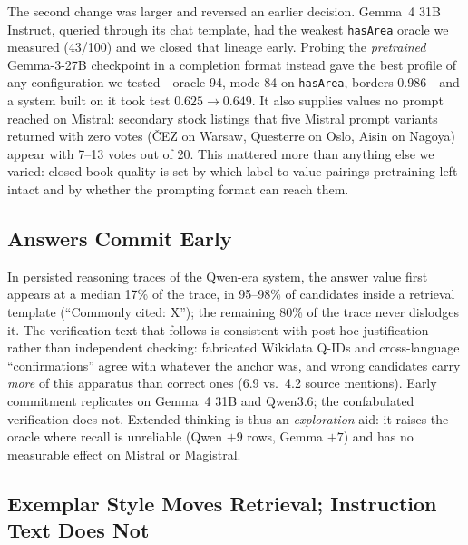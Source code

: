 \documentclass[11pt]{article}
\begin{document}
The second change was larger and reversed an earlier decision. Gemma~4
31B Instruct, queried through its chat template, had the weakest
\texttt{hasArea} oracle we measured (43/100) and we closed that lineage
early. Probing the \emph{pretrained} Gemma-3-27B checkpoint in a
completion format instead gave the best profile of any configuration we
tested---oracle 94, mode 84 on \texttt{hasArea}, borders 0.986---and a
system built on it took test $0.625\rightarrow0.649$. It also supplies
values no prompt reached on Mistral: secondary stock listings that five
Mistral prompt variants returned with zero votes (\v{C}EZ on Warsaw,
Questerre on Oslo, Aisin on Nagoya) appear with 7--13 votes out of 20.
This mattered more than anything else we varied: closed-book
quality is set by which label-to-value pairings pretraining left intact
and by whether the prompting format can reach them.

\subsection{Answers Commit Early}
\label{sec:anchor}

In persisted reasoning traces of the Qwen-era system, the answer value
first appears at a median 17\% of the trace, in 95--98\% of candidates
inside a retrieval template (``Commonly cited: X''); the remaining 80\%
of the trace never dislodges it. The verification text that follows is
consistent with post-hoc justification rather than independent checking:
fabricated Wikidata Q-IDs and cross-language ``confirmations'' agree with
whatever the anchor was, and wrong candidates carry \emph{more} of this
apparatus than correct ones (6.9 vs.\ 4.2 source mentions). Early
commitment replicates on Gemma~4 31B and Qwen3.6; the confabulated
verification does not. Extended thinking is thus an \emph{exploration}
aid: it raises the oracle where recall is unreliable (Qwen $+9$ rows,
Gemma $+7$) and has no measurable effect on Mistral or Magistral.

\subsection{Exemplar Style Moves Retrieval; Instruction Text Does Not}
\label{sec:exemplar}
\end{document}

